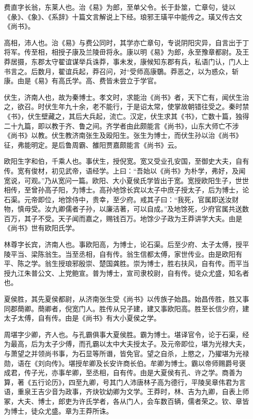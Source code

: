 \documentclass[]{article}
\begin{document}
费直字长翁，东莱人也。治《易》为郎，至单父令。长于卦筮，亡章句，徒以《彖》、《象》、《系辞》十篇文言解说上下经。琅邪王璜平中能传之。璜又传古文《尚书》。

高相，沛人也。治《易》与费公同时，其学亦亡章句，专说阴阳灾异，自言出于丁将军。传至相，相授子康及兰陵毌将永。康以明《易》为郎，永至豫章都尉。及王莽居摄，东郡太守翟谊谋举兵诛莽，事未发，康候知东郡有兵，私语门认，门人上书言之。后数月，翟谊兵起，莽召问，对``受师高康鸀。莽恶之，以为惑众，斩康。由是《易》有高氏学。高、费皆未尝立于学官。

伏生，济南人也，故为秦博士。孝文时，求能治《尚书》者，天下亡有，闻伏生治之，欲召。时伏生年九十余，老不能行，于是诏太常，使掌故朝错往受之。秦时禁《书》，伏生壁藏之，其后大兵起，流亡。汉定，伏生求其《书》，亡数十篇，独得二十九篇，即以教于齐、鲁之间。齐学者由此颇能言《尚书》，山东大师亡不涉《尚书》以教。伏生教济南张生及殴阳生。张生为博士，而伏生孙以治《尚书》征，弗能明定。是后鲁周霸、雒阳贾嘉颇能言《尚书》云。

欧阳生字和伯，千乘人也。事伏生，授倪宽。宽又受业孔安国，至御史大夫，自有传。宽有俊材，初见武帝，语经学。上曰：``吾始以《尚书》为朴学，弗好，及闻宽说，可观。''乃从宽问一篇。欧阳、大小夏侯氏学皆出于宽。宽授欧阳生子，世世相传，至曾孙高子阳，为博士。高孙地馀长宾以太子中庶子授太子，后为博士，论石渠。元帝即位，地馀侍中，贵幸，至少府。戒其子曰：``我死，官属即送汝财物，慎毋受。汝九卿儒者子孙，以廉洁著，可以自成。''及地馀死，少府官属共送数百万，其子不受。天子闻而嘉之，赐钱百万。地馀少子政为王莽讲学大夫。由是《尚书》世有欧阳氏学。

林尊字长宾，济南人也。事欧阳高，为博士，论石渠。后至少府、太子太傅，授平陵平当、梁陈翁生。当至丞相，自有传。翁生信都太傅，家世传业。由是欧阳有平、陈之学。翁生授琅邪殷崇、楚国龚胜。崇为博士，胜右扶风，自有传。而平当授九江朱普公文、上党鲍宣。普为博士，宣司隶校尉，自有传。徒众尤盛，知名者也。

夏侯胜，其先夏侯都尉，从济南张生受《尚书》以传族子始昌。始昌传胜，胜又事同郡蕳卿。蕳卿者，倪宽门人。胜传从兄子建，建又事欧阳高。胜至长信少府，建太子太傅，自有传。由是《尚书》有大小夏侯之学。

周堪字少卿，齐人也。与孔霸俱事大夏侯胜。霸为博士。堪译官令，论于石渠，经为最高，后为太子少傅，而孔霸以太中大夫授太子。及元帝即位，堪为光禄大夫，与萧望之并领尚书事，为石显等所谮，皆免官。望之自杀，上愍之，乃擢堪为光禄勋，语在《刘向传》。堪授牟卿及长安许商长伯。牟卿为博士。霸以帝师赐爵号褒成君，传子光，亦事牟卿，至丞相，自有传。由是大夏侯有孔、许之学。商善为算，著《五行论历》，四至九卿，号其门人沛唐林子高为德行，平陵吴章伟君为言语，重泉王吉少音为政事，齐炔钦幼卿为文学。王莽时，林、吉为九卿，自表上师冢，大夫、博士，郎吏为许氏学者，各从门人，会车数百辆，儒者荣之。钦、章皆为博士，徒众尤盛。章为王莽所诛。
\end{document}
